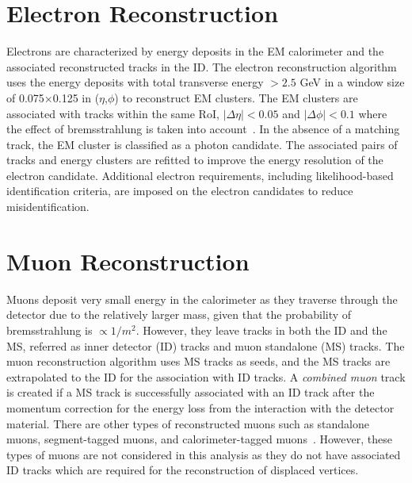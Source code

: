 \section{Electron Reconstruction}
\label{sec:reco:lep}

Electrons are characterized by energy deposits in the EM calorimeter and the associated reconstructed tracks in the ID. The electron reconstruction algorithm uses the energy deposits with total transverse energy $>2.5$ \si{\GeV} in a window size of 0.075$\times$0.125 in ($\eta$,$\phi$) to reconstruct EM clusters. The EM clusters are associated with tracks within the same RoI, $|\Delta\eta|<0.05$ and $|\Delta\phi|<0.1$ where the effect of bremsstrahlung is taken into account~\cite{Aad:2014fxa}. In the absence of a matching track, the EM cluster is classified as a photon candidate. The associated pairs of tracks and energy clusters are refitted to improve the energy resolution of the electron candidate. Additional electron requirements, including likelihood-based identification criteria, are imposed on the electron candidates to reduce misidentification.


\section{Muon Reconstruction}
\label{sec:reco:muon}

Muons deposit very small energy in the calorimeter as they traverse through the detector due to the relatively larger mass, given that the probability of bremsstrahlung is $\propto 1/m^{2}$. However, they leave tracks in both the ID and the MS, referred as inner detector (ID) tracks and muon standalone (MS) tracks. The muon reconstruction algorithm uses MS tracks as seeds, and the MS tracks are extrapolated to the ID for the association with ID tracks. A \textit{combined muon} track is created if a MS track is successfully associated with an ID track after the momentum correction for the energy loss from the interaction with the detector material. There are other types of reconstructed muons such as standalone muons, segment-tagged muons, and calorimeter-tagged muons~\cite{Aad:2016jkr}. However, these types of muons are not considered in this analysis as they do not have associated ID tracks which are required for the reconstruction of displaced vertices.

